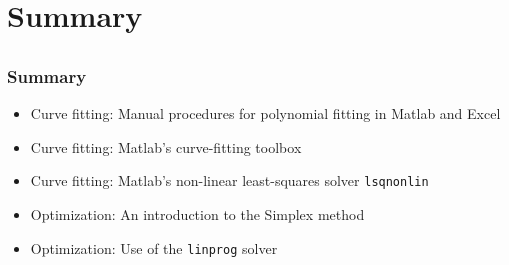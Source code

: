 \section{Summary}
\subsection*{}
\begin{frame}
  \frametitle{Summary}
  \begin{itemize}
    \item Curve fitting: Manual procedures for polynomial fitting in Matlab and Excel
    \item Curve fitting: Matlab's curve-fitting toolbox
    \item Curve fitting: Matlab's non-linear least-squares solver \lstinline$lsqnonlin$
    \item Optimization: An introduction to the Simplex method
    \item Optimization: Use of the \lstinline$linprog$ solver
  \end{itemize}

\end{frame}
